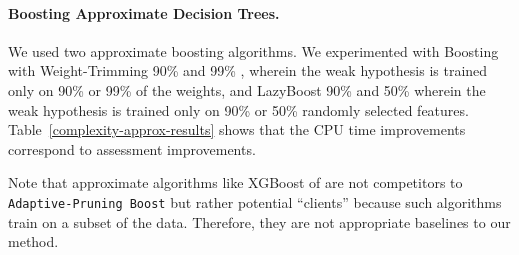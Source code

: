 

\paragraph{Boosting Approximate Decision Trees.}
We used two approximate boosting algorithms.
We experimented with Boosting with Weight-Trimming 90\% and 99\% \citep{Friedman98additivelogistic}, wherein the weak hypothesis is trained only on 90\% or 99\% of the weights, and LazyBoost 90\% and 50\% \citep{Escudero:2001:ULW:2387364.2387381} wherein the weak hypothesis is trained only on 90\% or 50\% randomly selected features. Table~\ref{complexity-approx-results} shows that the CPU time improvements correspond to assessment improvements.

Note that approximate algorithms like XGBoost of \cite{Chen:2016:XST:2939672.2939785} are not competitors to \texttt{Adaptive-Pruning Boost} but rather potential ``clients'' because such algorithms train on a subset of the data. Therefore, they are not appropriate baselines to our method.

